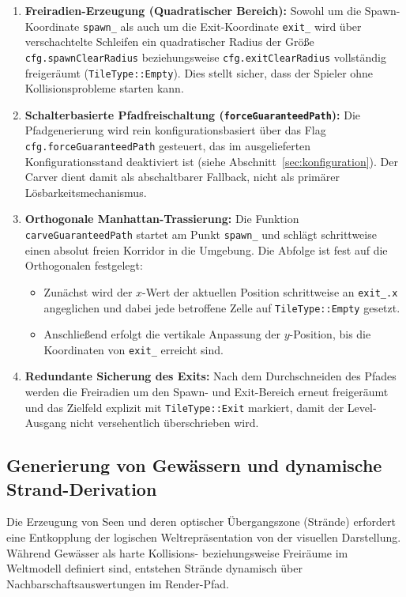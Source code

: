 \documentclass[
  a4paper,
  11pt,
  twoside,
  BCOR=8mm,           %
  headings=big,
  numbers=noenddot,
  listof=totoc,       %
  captions=tableheading,
]{scrreprt}
\begin{document}
\begin{enumerate}
    \item \textbf{Freiradien-Erzeugung (Quadratischer Bereich):} Sowohl um die Spawn-Koordinate \texttt{spawn\_} als auch um die Exit-Koordinate \texttt{exit\_} wird über verschachtelte Schleifen ein quadratischer Radius der Größe \texttt{cfg.spawnClearRadius} beziehungsweise \texttt{cfg.exitClearRadius} vollständig freigeräumt (\texttt{TileType::Empty}). Dies stellt sicher, dass der Spieler ohne Kollisionsprobleme starten kann.
    \item \textbf{Schalterbasierte Pfadfreischaltung (\texttt{forceGuaranteedPath}):} Die Pfadgenerierung wird rein konfigurationsbasiert über das Flag \texttt{cfg.forceGuaranteedPath} gesteuert, das im ausgelieferten Konfigurationsstand deaktiviert ist (siehe Abschnitt~\ref{sec:konfiguration}). Der Carver dient damit als abschaltbarer Fallback, nicht als primärer Lösbarkeitsmechanismus.
    \item \textbf{Orthogonale Manhattan-Trassierung:} Die Funktion \texttt{carveGuaranteedPath} startet am Punkt \texttt{spawn\_} und schlägt schrittweise einen absolut freien Korridor in die Umgebung. Die Abfolge ist fest auf die Orthogonalen festgelegt:
    \begin{itemize}
        \item Zunächst wird der $x$-Wert der aktuellen Position schrittweise an \texttt{exit\_.x} angeglichen und dabei jede betroffene Zelle auf \texttt{TileType::Empty} gesetzt.
        \item Anschließend erfolgt die vertikale Anpassung der $y$-Position, bis die Koordinaten von \texttt{exit\_} erreicht sind.
    \end{itemize}
    \item \textbf{Redundante Sicherung des Exits:} Nach dem Durchschneiden des Pfades werden die Freiradien um den Spawn- und Exit-Bereich erneut freigeräumt und das Zielfeld explizit mit \texttt{TileType::Exit} markiert, damit der Level-Ausgang nicht versehentlich überschrieben wird.
\end{enumerate}

\subsection{Generierung von Gewässern und dynamische Strand-Derivation}
\label{sec:umsetzung_lakes_beaches}

Die Erzeugung von Seen und deren optischer Übergangszone (Strände) erfordert eine Entkopplung der logischen Weltrepräsentation von der visuellen Darstellung. Während Gewässer als harte Kollisions- beziehungsweise Freiräume im Weltmodell definiert sind, entstehen Strände dynamisch über Nachbarschaftsauswertungen im Render-Pfad.
\end{document}
